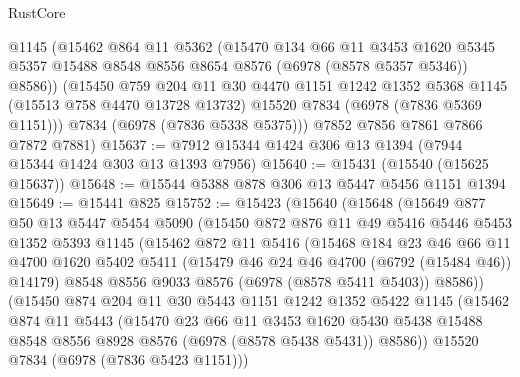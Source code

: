 \begin{lexlean}{RustCore}
\begin{coremodule}
        @1145
        (@15462
          @864
          @11
          @5362
          (@15470
            @134
            @66
            @11
            @3453
            @1620
            @5345
            @5357
            @15488
            @8548
            @8556
            @8654
            @8576
            (@6978 (@8578 @5357 @5346))
            @8586))
        (@15450
          @759
          @204
          @11
          @30
          @4470
          @1151
          @1242
          @1352
          @5368
          @1145
          (@15513 @758 @4470 @13728 @13732)
          @15520
          @7834
          (@6978 (@7836 @5369 @1151)))
        @7834
        (@6978 (@7836 @5338 @5375)))
      @7852
      @7856
      @7861
      @7866
      @7872
      @7881)
@15637 := @7912 @15344 @1424 @306 @13 @1394 (@7944 @15344 @1424 @303 @13 @1393 @7956)
@15640 := @15431 (@15540 (@15625 @15637))
@15648 := @15544 @5388 @878 @306 @13 @5447 @5456 @1151 @1394
@15649 := @15441 @825
@15752 := @15423
    (@15640
      (@15648
        (@15649
          @877
          @50
          @13
          @5447
          @5454
          @5090
          (@15450
            @872
            @876
            @11
            @49
            @5416
            @5446
            @5453
            @1352
            @5393
            @1145
            (@15462
              @872
              @11
              @5416
              (@15468
                @184
                @23
                @46
                @66
                @11
                @4700
                @1620
                @5402
                @5411
                (@15479 @46 @24 @46 @4700 (@6792 (@15484 @46)) @14179)
                @8548
                @8556
                @9033
                @8576
                (@6978 (@8578 @5411 @5403))
                @8586))
            (@15450
              @874
              @204
              @11
              @30
              @5443
              @1151
              @1242
              @1352
              @5422
              @1145
              (@15462
                @874
                @11
                @5443
                (@15470
                  @23
                  @66
                  @11
                  @3453
                  @1620
                  @5430
                  @5438
                  @15488
                  @8548
                  @8556
                  @8928
                  @8576
                  (@6978 (@8578 @5438 @5431))
                  @8586))
              @15520
              @7834
              (@6978 (@7836 @5423 @1151)))

\end{coremodule}
\end{lexlean}
